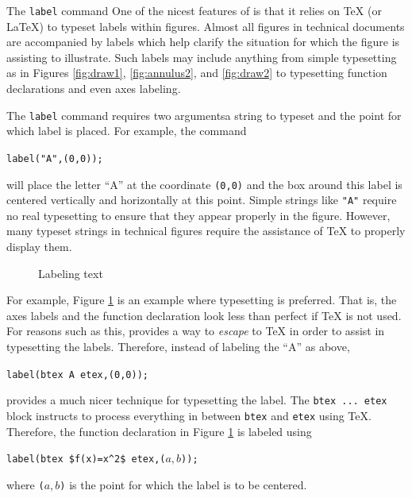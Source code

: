 \begin{subsection}{The \texttt{label} command}
One of the nicest features of \MP{} is that it relies on \TeX{} (or \LaTeX) to typeset labels within figures.  Almost all figures in technical documents are accompanied by labels which help clarify the situation for which the figure is assisting to illustrate.  Such labels may include anything from simple typesetting as in Figures \ref{fig:draw1}, \ref{fig:annulus2}, and \ref{fig:draw2} to typesetting function declarations and even axes labeling.

The \texttt{label} command requires two arguments\Dash a string to typeset and the point for which label is placed.  For example, the command \begin{center}\verb|label("A",(0,0));|\end{center} will place the letter ``A'' at the coordinate \texttt{(0,0)} and the box around this label is centered vertically and horizontally at this point.  Simple strings like \texttt{"A"} require no real typesetting to ensure that they appear properly in the figure.  However, many typeset strings in technical figures require the assistance of \TeX{} to properly display them.
\begin{figure}[ht]
	\begin{center}\end{center}
	\caption{Labeling text}\label{fig:parabola}
\end{figure}
For example, Figure \ref{fig:parabola} is an example where typesetting is preferred.  That is, the axes labels and the function declaration look less than perfect if \TeX{} is not used.  For reasons such as this, \MP{} provides a way to \textit{escape} to \TeX{} in order to assist in typesetting the labels.  Therefore, instead of labeling the ``A'' as above, \begin{center}\verb|label(btex A etex,(0,0));|\end{center} provides a much nicer technique for typesetting the label.  The \texttt{btex\,...\,etex} block instructs \MP{} to process everything in between \texttt{btex} and \texttt{etex} using \TeX.  Therefore, the function declaration in Figure \ref{fig:parabola} is labeled using \begin{center}\verb|label(btex $f(x)=x^2$ etex,(|$a,b$\verb|));|\end{center} where \verb|(|$a,b$\verb|)| is the point for which the label is to be centered.


\end{subsection}
